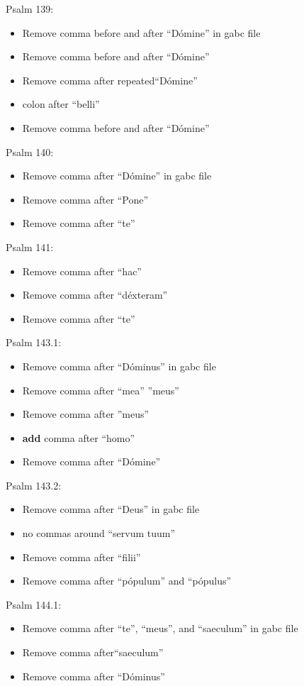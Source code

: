 \documentclass[11pt]{article}
\begin{document}
Psalm 139:
  \begin{itemize}
  \item Remove comma before and after ``Dómine'' in gabc file
  \item  Remove comma before and after ``Dómine'' 
  \item  Remove comma after repeated``Dómine'' 
 \item colon after ``belli''
  \item Remove comma before and after ``Dómine'' 
    \end{itemize}

Psalm 140:
  \begin{itemize}
  \item  Remove comma after ``Dómine'' in gabc file
  \item  Remove comma after ``Pone''
 \item
 Remove comma after ``te''
    \end{itemize}

Psalm 141:
  \begin{itemize}
  \item Remove comma after ``hac''
  \item  Remove comma after ``déxteram''
    \item  Remove comma after ``te''

    \end{itemize}

      Psalm 143.1:
  \begin{itemize}
  \item Remove comma after ``Dóminus'' in gabc file
  \item  Remove comma after ``mea'' ''meus''
    \item  Remove comma after ''meus''
    \item
    \textbf{add} comma after ``homo''
      \item  Remove comma after ``Dómine'' 
    \end{itemize}

 Psalm 143.2:
  \begin{itemize}
  \item Remove comma after ``Deus'' in gabc file
    \item  no commas around ``servum tuum''
      \item Remove comma after ``filii'' 
   \item Remove comma after ``pópulum'' and ``pópulus'' 
    \end{itemize}

      Psalm 144.1:
  \begin{itemize}
    \item Remove comma after ``te'', ``meus'',  and ``saeculum'' in gabc file 
  \item   Remove comma after``saeculum''
    \item Remove comma after ``Dóminus'' 
    \end{itemize}
\end{document}
